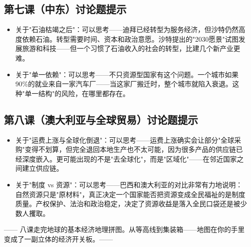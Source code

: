 \documentclass[a4paper,12pt]{ctexart}
\begin{document}
\subsection*{第七课（中东）讨论题提示}
\begin{itemize}
  \item 关于"石油枯竭之后"：可以思考——迪拜已经转型为服务经济，但沙特仍然高度依赖石油。转型需要时间、资本和政治意愿。沙特提出的"2030愿景"试图发展旅游和科技——但一个习惯了石油收入的社会的转型，比建几个新产业更难。
  \item 关于"单一依赖"：可以思考——不只资源型国家有这个问题。一个城市如果90\%的就业来自一家汽车厂——当这家厂搬迁时，整个城市就陷入衰退。这种"单一结构"的风险，在哪里都存在。
\end{itemize}

\subsection*{第八课（澳大利亚与全球贸易）讨论题提示}
\begin{itemize}
  \item 关于"运费上涨与全球化倒退"：可以思考——运费上涨确实会让部分"全球采购"变得不划算，但完全退回本地生产也不太可能，因为很多产品的供应链已经深度嵌入。更可能出现的不是"去全球化"，而是"区域化"——在邻近国家之间建立供应链。
  \item 关于"制度 vs 资源"：可以思考——巴西和澳大利亚的对比非常有力地说明：自然资源只是"原材料"，真正决定一个国家能否把资源变成全民福祉的是制度质量。产权保护、法治和政治稳定，决定了资源收益是落入全民口袋还是被少数人攫取。
\end{itemize}

\vspace{0.5cm}
\begin{center}
\textcolor{blue!70!black}{\large —— 八课走完地球的基本经济地理拼图。从等高线到集装箱——地图在你的手里变成了一副立体的经济开关板。——}
\end{center}
\end{document}
